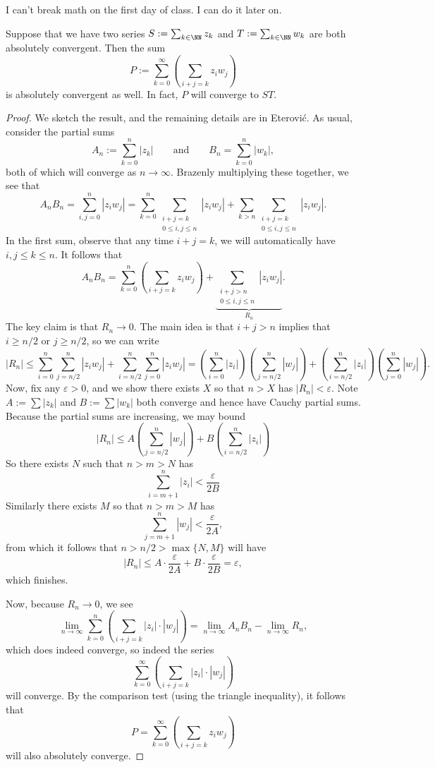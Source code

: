 \begin{quot}
	I can't break math on the first day of class. I can do it later on.
\end{quot}
\begin{lemma}
	Suppose that we have two series $S:=\sum_{k\in\NN}z_k$ and $T:=\sum_{k\in\NN}w_k$ are both absolutely convergent. Then the sum
	\[P:=\sum_{k=0}^\infty\left(\sum_{i+j=k}z_iw_j\right)\]
	is absolutely convergent as well. In fact, $P$ will converge to $ST$.
\end{lemma}
\begin{proof}
	We sketch the result, and the remaining details are in Eterovi\'c. As usual, consider the partial sums
	\[A_n:=\sum_{k=0}^n|z_k|\qquad\text{and}\qquad B_n=\sum_{k=0}^n|w_k|,\]
	both of which will converge as $n\to\infty$. Brazenly multiplying these together, we see that
	\[A_nB_n=\sum_{i,j=0}^n|z_iw_j|=\sum_{k=0}^n\sum_{\substack{i+j=k\\0\le i,j\le n}}|z_iw_j|+\sum_{k>n}\sum_{\substack{i+j=k\\0\le i,j\le n}}|z_iw_j|.\]
	In the first sum, observe that any time $i+j=k$, we will automatically have $i,j\le k\le n$. It follows that
	\[A_nB_n=\sum_{k=0}^n\left(\sum_{i+j=k}z_iw_j\right)+\underbrace{\sum_{\substack{i+j>n\\0\le i,j\le n}}|z_iw_j|}_{R_n}.\]
	The key claim is that $R_n\to0$. The main idea is that $i+j>n$ implies that $i\ge n/2$ or $j\ge n/2$, so we can write
	\[|R_n|\le\sum_{i=0}^n\sum_{j=n/2}^n|z_iw_j|+\sum_{i=n/2}^n\sum_{j=0}^n|z_iw_j|=\left(\sum_{i=0}^n|z_i|\right)\left(\sum_{j=n/2}^n|w_j|\right)+\left(\sum_{i=n/2}^n|z_i|\right)\left(\sum_{j=0}^n|w_j|\right).\]
	Now, fix any $\varepsilon>0$, and we show there exists $X$ so that $n>X$ has $|R_n|<\varepsilon$. Note $A:=\sum|z_k|$ and $B:=\sum|w_k|$ both converge and hence have Cauchy partial sums. Because the partial sums are increasing, we may bound
	\[|R_n|\le A\left(\sum_{j=n/2}^n|w_j|\right)+B\left(\sum_{i=n/2}^n|z_i|\right)\]
	So there exists $N$ such that $n>m>N$ has
	\[\sum_{i=m+1}^n|z_i|<\frac\varepsilon {2B}\]
	Similarly there exists $M$ so that $n>m>M$ has
	\[\sum_{j=m+1}^n|w_j|<\frac\varepsilon {2A},\]
	from which it follows that $n>n/2>\max\{N,M\}$ will have
	\[|R_n|\le A\cdot\frac\varepsilon {2A}+B\cdot\frac\varepsilon {2B}=\varepsilon,\]
	which finishes.

	Now, because $R_n\to0$, we see
	\[\lim_{n\to\infty}\sum_{k=0}^n\left(\sum_{i+j=k}|z_i|\cdot|w_j|\right)=\lim_{n\to\infty}A_nB_n-\lim_{n\to\infty}R_n,\]
	which does indeed converge, so indeed the series
	\[\sum_{k=0}^\infty\left(\sum_{i+j=k}|z_i|\cdot|w_j|\right)\]
	will converge. By the comparison test (using the triangle inequality), it follows that
	\[P=\sum_{k=0}^\infty\left(\sum_{i+j=k}z_iw_j\right)\]
	will also absolutely converge.


\end{proof}
